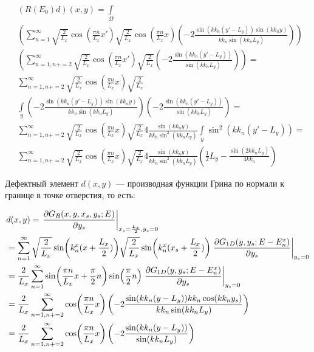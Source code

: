 \begin{align*}
& (R(E_0) d)(x, y) = \int\limits_\Omega \\
& \left(
\sum\limits_{n = 1}^\infty
\sqrt{\frac{2}{L_x}} \cos(\frac{\pi n}{L_x} x') \sqrt{\frac{2}{L_x}} \cos(\frac{\pi n}{L_x} x)
\left(-2\frac{\sin(kk_n(y' - L_y)) \sin(kk_n y)}{kk_n \sin(kk_n L_y)}\right)
\right) \\
& \left(
\sum\limits_{n = 1, n += 2}^\infty
\sqrt{\frac{2}{L_x}} \cos(\frac{\pi n}{L_x} x') \sqrt{\frac{2}{L_x}}
\left(-2\frac{\sin(kk_n(y' - L_y))}{\sin(kk_n L_y)}\right)
\right) = \\
& \sum\limits_{n = 1, n += 2}^\infty
\sqrt{\frac{2}{L_x}} \cos(\frac{\pi n}{L_x} x) \sqrt{\frac{2}{L_x}}\\
& \int\limits_y  \left(-2\frac{\sin(kk_n(y' - L_y)) \sin(kk_n y)}{kk_n \sin(kk_n L_y)}\right)
\left(-2\frac{\sin(kk_n(y' - L_y))}{\sin(kk_n L_y)}\right) = \\
& \sum\limits_{n = 1, n += 2}^\infty
\sqrt{\frac{2}{L_x}} \cos(\frac{\pi n}{L_x} x) \sqrt{\frac{2}{L_x}} 4 \frac{\sin(kk_n y) }{kk_n \sin^2(kk_n L_y)}\int\limits_y  \sin^2(kk_n(y' - L_y)) = \\
& \sum\limits_{n = 1, n += 2}^\infty
\sqrt{\frac{2}{L_x}} \cos(\frac{\pi n}{L_x} x) \sqrt{\frac{2}{L_x}} 4 \frac{\sin(kk_n y) }{kk_n \sin^2(kk_n L_y)}
\left( \frac{1}{2} L_y - \frac{\sin(2 kk_n L_y)}{4 kk_n} \right)
\end{align*}



Дефектный элемент $d(x, y)$ — производная функции Грина по нормали к границе в точке отверстия, то есть:

\begin{align*}
& d(x, y) = \eval{\pdv{G_R(x, y, x_s, y_s; E)}{y_s}}_{x_s = \frac{L_x}{2}, y_s = 0} \\
&= \sum\limits_{n = 1}^\infty
\sqrt{\frac{2}{L_x}} \sin(k_n^x (x + \frac{L_x}{2}))
\sqrt{\frac{2}{L_x}} \sin(k_n^x (x_s + \frac{L_x}{2}))
\eval{\pdv{G_{1D}(y, y_s; E - E^x_n)}{y_s}}_{y_s = 0} \\
&= \frac{2}{L_x} \sum\limits_{n = 1}^\infty
\sin(\frac{\pi n}{L_x} x + \frac{\pi}{2} n)
\sin(\frac{\pi}{2} n)
\eval{\pdv{G_{1D}(y, y_s; E - E^x_n)}{y_s}}_{y_s = 0} \\
&= \frac{2}{L_x} \sum\limits_{n = 1, n += 2}^\infty
\cos(\frac{\pi n}{L_x} x)
\left(-2\frac{\sin(kk_n(y - L_y)) kk_n \cos(kk_n y_s)}{kk_n \sin(kk_n L_y)}\right) \\
&= \frac{2}{L_x} \sum\limits_{n = 1, n += 2}^\infty
\cos(\frac{\pi n}{L_x} x)
\left(-2\frac{\sin(kk_n(y - L_y))}{\sin(kk_n L_y)}\right)
\end{align*}


